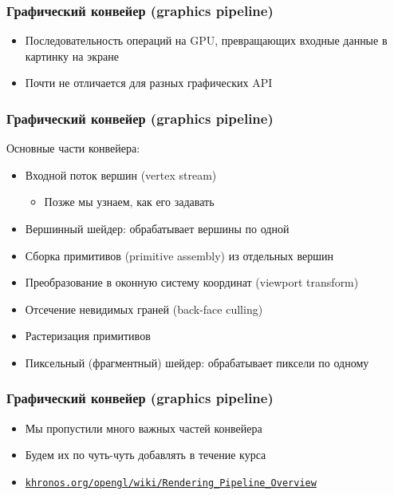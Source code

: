 \documentclass[10pt]{beamer}
\begin{document}
\begin{frame}[fragile]
\frametitle{Графический конвейер (graphics pipeline)}
\begin{itemize}
\item Последовательность операций на GPU, превращающих входные данные в картинку на экране
\pause
\item Почти не отличается для разных графических API
\end{itemize}
\end{frame}

\begin{frame}[fragile]
\frametitle{Графический конвейер (graphics pipeline)}
Основные части конвейера:
\begin{itemize}
\item Входной поток вершин (vertex stream)
\pause
\begin{itemize}
\item Позже мы узнаем, как его задавать
\end{itemize}
\pause
\item Вершинный шейдер: обрабатывает вершины по одной
\pause
\item Сборка примитивов (primitive assembly) из отдельных вершин
\pause
\item Преобразование в оконную систему координат (viewport transform)
\pause
\item Отсечение невидимых граней (back-face culling)
\pause
\item Растеризация примитивов
\pause
\item Пиксельный (фрагментный) шейдер: обрабатывает пиксели по одному
\end{itemize}
\end{frame}

\begin{frame}[fragile]
\frametitle{Графический конвейер (graphics pipeline)}
\begin{itemize}
\item Мы пропустили много важных частей конвейера
\item Будем их по чуть-чуть добавлять в течение курса
\item \href{https://www.khronos.org/opengl/wiki/Rendering_Pipeline_Overview}{\nolinkurl{khronos.org/opengl/wiki/Rendering_Pipeline_Overview}}
\end{itemize}
\end{frame}
\end{document}
